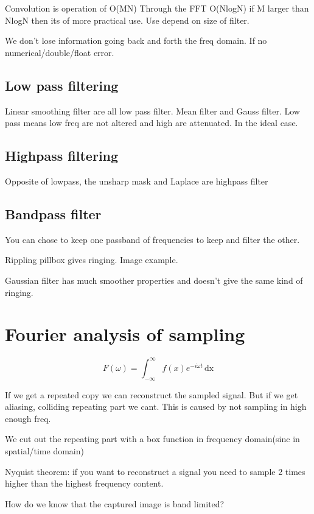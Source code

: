 Convolution is operation of O(MN) Through the FFT O(NlogN) if M larger than NlogN then its of more practical use. Use depend on size of filter. 

We don't lose information going back and forth the freq domain. If no numerical/double/float error. 

\subsection*{Low pass filtering}
Linear smoothing filter are all low pass filter. Mean filter and Gauss filter. Low pass means low freq are not altered and high are attenuated. In the ideal case. 

\subsection*{Highpass filtering}
Opposite of lowpass, the unsharp mask and Laplace are highpass filter

\subsection*{Bandpass filter}
You can chose to keep one passband of frequencies to keep and filter the other.

Rippling pillbox gives ringing. Image example.

Gaussian filter has much smoother properties and doesn't give the same kind of ringing. 

\section{Fourier analysis of sampling}
\begin{equation}
F(\omega) = \int_{-\infty}^{\infty} f(x) e^{-i\omega t}\,\text{dx}
\end{equation} %

If we get a repeated copy we can reconstruct the sampled  signal. But if we get aliasing, colliding repeating part we cant. This is caused by not sampling in high enough freq. 

We cut out the repeating part with a box function in frequency domain(sinc in spatial/time domain) 

Nyquist theorem:  if you want to reconstruct a signal you need to sample 2 times higher than the highest frequency content. 

How do we know that the captured image is band limited?

 


